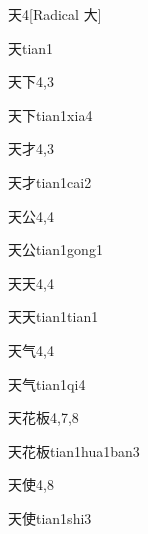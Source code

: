 \begin{entry}{天}{4}[Radical 大]
  \begin{phonetics}{天}{tian1}
  \end{phonetics}
\end{entry}

\begin{entry}{天下}{4,3}
  \begin{phonetics}{天下}{tian1xia4}
  \end{phonetics}
\end{entry}

\begin{entry}{天才}{4,3}
  \begin{phonetics}{天才}{tian1cai2}
  \end{phonetics}
\end{entry}

\begin{entry}{天公}{4,4}
  \begin{phonetics}{天公}{tian1gong1}
  \end{phonetics}
\end{entry}

\begin{entry}{天天}{4,4}
  \begin{phonetics}{天天}{tian1tian1}
  \end{phonetics}
\end{entry}

\begin{entry}{天气}{4,4}
  \begin{phonetics}{天气}{tian1qi4}
  \end{phonetics}
\end{entry}

\begin{entry}{天花板}{4,7,8}
  \begin{phonetics}{天花板}{tian1hua1ban3}
  \end{phonetics}
\end{entry}

\begin{entry}{天使}{4,8}
  \begin{phonetics}{天使}{tian1shi3}
  \end{phonetics}
\end{entry}

